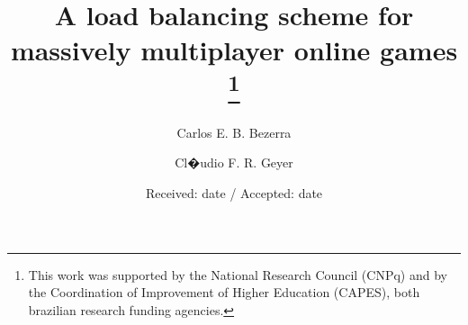 \title{A load balancing scheme for massively multiplayer online games \thanks{This work was supported by the National Research Council (CNPq) and by the Coordination of Improvement of Higher Education (CAPES), both brazilian research funding agencies.}
}


\author{Carlos E. B. Bezerra         \and
        Cl�udio F. R. Geyer %
}



\date{Received: date / Accepted: date}


\maketitle

